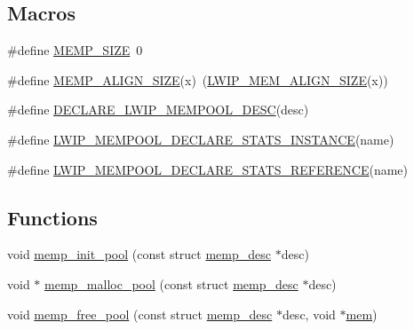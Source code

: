\subsection*{Macros}
\begin{DoxyCompactItemize}
\item 
\#define \hyperlink{openmote-cc2538_2lwip_2src_2include_2lwip_2priv_2memp__priv_8h_a7f8c378e0581aa2dc491cff52ae4fce2}{M\+E\+M\+P\+\_\+\+S\+I\+ZE}~0
\item 
\#define \hyperlink{openmote-cc2538_2lwip_2src_2include_2lwip_2priv_2memp__priv_8h_a12e0cfbac9c8263e5a1fb319b92338e7}{M\+E\+M\+P\+\_\+\+A\+L\+I\+G\+N\+\_\+\+S\+I\+ZE}(x)~(\hyperlink{group__compiler__abstraction_gaef204be511fd32f681b55abc08e9ae18}{L\+W\+I\+P\+\_\+\+M\+E\+M\+\_\+\+A\+L\+I\+G\+N\+\_\+\+S\+I\+ZE}(x))
\item 
\#define \hyperlink{openmote-cc2538_2lwip_2src_2include_2lwip_2priv_2memp__priv_8h_aabec8ab3418486aed704fb8bb933da42}{D\+E\+C\+L\+A\+R\+E\+\_\+\+L\+W\+I\+P\+\_\+\+M\+E\+M\+P\+O\+O\+L\+\_\+\+D\+E\+SC}(desc)
\item 
\#define \hyperlink{openmote-cc2538_2lwip_2src_2include_2lwip_2priv_2memp__priv_8h_a9373cb7cc6e658a60cec6ca57173a72d}{L\+W\+I\+P\+\_\+\+M\+E\+M\+P\+O\+O\+L\+\_\+\+D\+E\+C\+L\+A\+R\+E\+\_\+\+S\+T\+A\+T\+S\+\_\+\+I\+N\+S\+T\+A\+N\+CE}(name)
\item 
\#define \hyperlink{openmote-cc2538_2lwip_2src_2include_2lwip_2priv_2memp__priv_8h_a46723c1d1d900d5f23e5bde91d22d8be}{L\+W\+I\+P\+\_\+\+M\+E\+M\+P\+O\+O\+L\+\_\+\+D\+E\+C\+L\+A\+R\+E\+\_\+\+S\+T\+A\+T\+S\+\_\+\+R\+E\+F\+E\+R\+E\+N\+CE}(name)
\end{DoxyCompactItemize}
\subsection*{Functions}
\begin{DoxyCompactItemize}
\item 
void \hyperlink{openmote-cc2538_2lwip_2src_2include_2lwip_2priv_2memp__priv_8h_a6416303426d05526bed33f241fa6ecd7}{memp\+\_\+init\+\_\+pool} (const struct \hyperlink{structmemp__desc}{memp\+\_\+desc} $\ast$desc)
\item 
void $\ast$ \hyperlink{openmote-cc2538_2lwip_2src_2include_2lwip_2priv_2memp__priv_8h_a348c83ee972f1edf7296a1cdf1d75f22}{memp\+\_\+malloc\+\_\+pool} (const struct \hyperlink{structmemp__desc}{memp\+\_\+desc} $\ast$desc)
\item 
void \hyperlink{openmote-cc2538_2lwip_2src_2include_2lwip_2priv_2memp__priv_8h_a62f8c3c907743e34eee3cdac7fa1eaa5}{memp\+\_\+free\+\_\+pool} (const struct \hyperlink{structmemp__desc}{memp\+\_\+desc} $\ast$desc, void $\ast$\hyperlink{structmem}{mem})
\end{DoxyCompactItemize}


